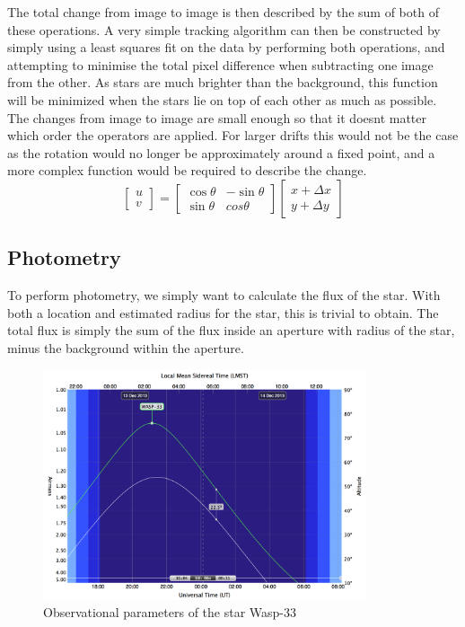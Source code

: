 The total change from image to image is then described by the sum of both of these operations. A very simple tracking algorithm can then be constructed by simply using a least squares fit on the data by performing both operations, and attempting to minimise the total pixel difference when subtracting one image from the other. As stars are much brighter than the background, this function will be minimized when the stars lie on top of each other as much as possible. The changes from image to image are small enough so that it doesnt matter which order the operators are applied. For larger drifts this would not be the case as the rotation would no longer be approximately around a fixed point, and a more complex function would be required to describe the change.
\[
\begin{bmatrix}
    u \\ v
\end{bmatrix}
=
\begin{bmatrix}
\cos\theta & -\sin\theta \\
\sin\theta & cos\theta
\end{bmatrix}
\begin{bmatrix}
    x + \Delta x \\ y + \Delta y
\end{bmatrix}
\]

\subsection{Photometry}

To perform photometry, we simply want to calculate the flux of the star. With both a location and estimated radius for the star, this is trivial to obtain. The total flux is simply the sum of the flux inside an aperture with radius of the star, minus the background within the aperture.

\begin{figure}[ht]
    \centering
    \includegraphics[width=0.85\textwidth]{images/airmass.png}
    \caption{Observational parameters of the star Wasp-33}
    \label{fig:airmass}
\end{figure}

